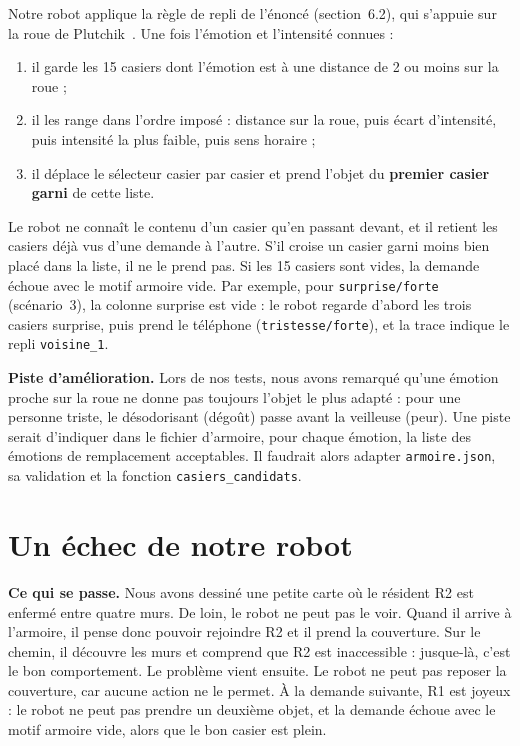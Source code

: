 \documentclass[11pt,a4paper]{article}
\newcommand{\code}[1]{\texttt{#1}}
\begin{document}
Notre robot applique la règle de repli de l'énoncé (section~6.2), qui s'appuie sur la roue de Plutchik~\cite{plutchik}. Une fois l'émotion et l'intensité connues :
\begin{enumerate}
  \item il garde les 15 casiers dont l'émotion est à une distance de 2 ou moins sur la roue ;
  \item il les range dans l'ordre imposé : distance sur la roue, puis écart d'intensité, puis intensité la plus faible, puis sens horaire ;
  \item il déplace le sélecteur casier par casier et prend l'objet du \textbf{premier casier garni} de cette liste.
\end{enumerate}
Le robot ne connaît le contenu d'un casier qu'en passant devant, et il retient les casiers déjà vus d'une demande à l'autre. S'il croise un casier garni moins bien placé dans la liste, il ne le prend pas. Si les 15 casiers sont vides, la demande échoue avec le motif \og armoire vide\fg{}. Par exemple, pour \code{surprise/forte} (scénario~3), la colonne surprise est vide : le robot regarde d'abord les trois casiers surprise, puis prend le téléphone (\code{tristesse/forte}), et la trace indique le repli \code{voisine\_1}.

\textbf{Piste d'amélioration.} Lors de nos tests, nous avons remarqué qu'une émotion proche sur la roue ne donne pas toujours l'objet le plus adapté : pour une personne triste, le désodorisant (dégoût) passe avant la veilleuse (peur). Une piste serait d'indiquer dans le fichier d'armoire, pour chaque émotion, la liste des émotions de remplacement acceptables. Il faudrait alors adapter \code{armoire.json}, sa validation et la fonction \code{casiers\_candidats}.
\section{Un échec de notre robot}\label{sec:echecs}

\textbf{Ce qui se passe.} Nous avons dessiné une petite carte où le résident R2 est enfermé entre quatre murs. De loin, le robot ne peut pas le voir. Quand il arrive à l'armoire, il pense donc pouvoir rejoindre R2 et il prend la couverture. Sur le chemin, il découvre les murs et comprend que R2 est inaccessible : jusque-là, c'est le bon comportement. Le problème vient ensuite. Le robot ne peut pas reposer la couverture, car aucune action ne le permet. À la demande suivante, R1 est joyeux : le robot ne peut pas prendre un deuxième objet, et la demande échoue avec le motif \og armoire vide\fg{}, alors que le bon casier est plein.
\end{document}
